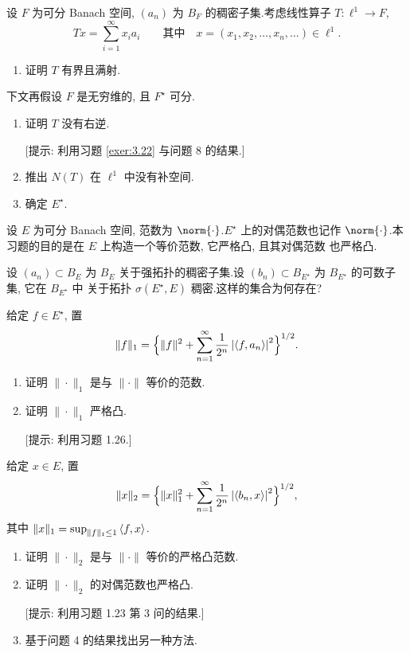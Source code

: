 \begin{exercise}
\label{exer:3.26}
设 $F$ 为可分 Banach 空间, $(a_n)$ 为 $B_F$ 的稠密子集.考虑线性算子
$T:\ell^1\to F$,
\begin{equation*}
Tx=\sum_{i=1}^\infty x_ia_i
\qquad\text{其中}\quad x=(x_1,x_2,\dots,x_n,\dots)\in\ell^1.
\end{equation*}

\begin{enumerate}[label=\arabic*., leftmargin=2.2em, itemsep=0.25em]
	\item 证明 $T$ 有界且满射.
\end{enumerate}
下文再假设 $F$ 是无穷维的, 且 $F^\star$ 可分.

\begin{enumerate}[label=\arabic*., leftmargin=2.2em, itemsep=0.25em, start=2]
	\item 证明 $T$ 没有右逆.

	      [提示: 利用习题  \ref{exer:3.22} 与问题 8 的结果.]
	\item 推出 $N(T)$ 在 $\ell^1$ 中没有补空间.
	\item 确定 $E^\star$.
\end{enumerate}
\end{exercise}

\begin{exercise}
\label{exer:3.27}
设 $E$ 为可分 Banach 空间, 范数为 $\norm{\cdot}$.$E^\star$ 上的对偶范数也记作
$\norm{\cdot}$.本习题的目的是在 $E$ 上构造一个等价范数, 它严格凸, 且其对偶范数
也严格凸.

设 $(a_n)\subset B_E$ 为 $B_E$ 关于强拓扑的稠密子集.设
$(b_n)\subset B_{E^\star}$ 为 $B_{E^\star}$ 的可数子集, 它在 $B_{E^\star}$ 中
关于\wstar{}拓扑 $\sigma(E^\star,E)$ 稠密.这样的集合为何存在?

给定 $f\in E^\star$, 置
\begin{equation*}
\|f\|_1=\Bigl\{\|f\|^2+\sum_{n=1}^\infty\frac{1}{2^n}\left|\left\langle f,a_n\right\rangle\right|^2
\Bigr\}^{1/2}.
\end{equation*}
\begin{enumerate}[label=\arabic*., leftmargin=2.2em, itemsep=0.25em]
	\item 证明 $\|\cdot\|_1$ 是与 $\|\cdot\|$ 等价的范数.
	\item 证明 $\|\cdot\|_1$ 严格凸.

	      [提示: 利用习题 1.26.]
\end{enumerate}
给定 $x\in E$, 置
\begin{equation*}
\|x\|_2=\Bigl\{\|x\|_1^2+\sum_{n=1}^\infty\frac{1}{2^n}
\left|\left\langle b_n,x\right\rangle\right|^2\Bigr\}^{1/2},
\end{equation*}
其中 $\|x\|_1=\sup_{\|f\|_1\le1}\left\langle f,x\right\rangle$.

\begin{enumerate}[label=\arabic*., leftmargin=2.2em, itemsep=0.25em, start=3]
	\item 证明 $\|\cdot\|_2$ 是与 $\|\cdot\|$ 等价的严格凸范数.
	\item 证明 $\|\cdot\|_2$ 的对偶范数也严格凸.

	      [提示: 利用习题 1.23 第 3 问的结果.]
	\item 基于问题 4 的结果找出另一种方法.
\end{enumerate}
\end{exercise}

